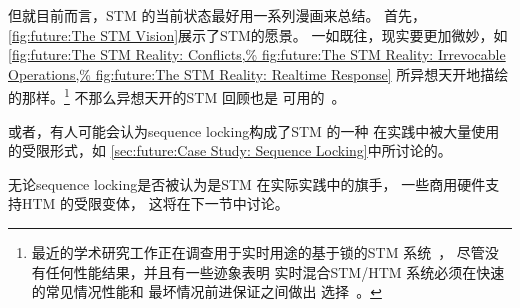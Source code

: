 但就目前而言，STM 的当前状态最好用一系列漫画来总结。
首先，\cref{fig:future:The STM Vision}展示了STM的愿景。
一如既往，现实要更加微妙，如
\cref{fig:future:The STM Reality: Conflicts,%
fig:future:The STM Reality: Irrevocable Operations,%
fig:future:The STM Reality: Realtime Response}
所异想天开地描绘的那样。\footnote{
	最近的学术研究工作正在调查用于实时用途的基于锁的STM
	系统~\cite{JimAnderson2019STMRT,CatherineNemitz2018LockSTMrealtime}，
	尽管没有任何性能结果，并且有一些迹象表明
	实时混合STM/HTM 系统必须在快速的常见情况性能和
	最坏情况前进保证之间做出
	选择~\cite{DBLP:journals/corr/AlistarhKKRS14,MartinSchoeberl2010realtimeTM}。}
不那么异想天开的STM 回顾也是
可用的~\cite{JoeDuffy2010RetroTM,JoeDuffy2010RetroTM2}。

或者，有人可能会认为sequence locking构成了STM 的一种
在实践中被大量使用的受限形式，如
\cref{sec:future:Case Study: Sequence Locking}中所讨论的。

无论sequence locking是否被认为是STM 在实际实践中的旗手，
一些商用硬件支持HTM 的受限变体，
这将在下一节中讨论。
